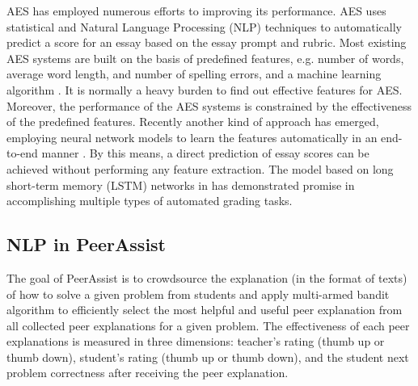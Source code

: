\documentclass{article}
\begin{document}
AES has employed numerous efforts to improving its performance. AES uses statistical and Natural Language Processing (NLP) techniques to automatically predict a score for an essay based on the essay prompt and rubric. Most existing AES systems are built on the basis of predefined features, e.g. number of words, average word length, and number of spelling errors, and a machine learning algorithm \cite{Chen2013-zw}. It is normally a heavy burden to find out effective features for AES. Moreover, the performance of the AES systems is constrained by the effectiveness of the predefined features. Recently another kind of approach has emerged, employing neural network models to learn the features automatically in an end-to-end manner \cite{Taghipour2016-ns}. By this means, a direct prediction of essay scores can be achieved without performing any feature extraction. The model based on long short-term memory (LSTM) networks in \cite{Taghipour2016-ns} has demonstrated promise in accomplishing multiple types of automated grading tasks.

\subsection{NLP in PeerAssist}
The goal of PeerAssist is to crowdsource the explanation (in the
format of texts) of how to solve a
given problem from students and apply multi-armed bandit algorithm to
efficiently select the most helpful and useful peer explanation from all collected
peer explanations for a given problem. The effectiveness of each peer
explanations is measured in three dimensions: teacher's rating (thumb
up or thumb down), student's rating (thumb up or thumb down), and the
student next problem correctness after receiving the peer explanation.


\end{document}
